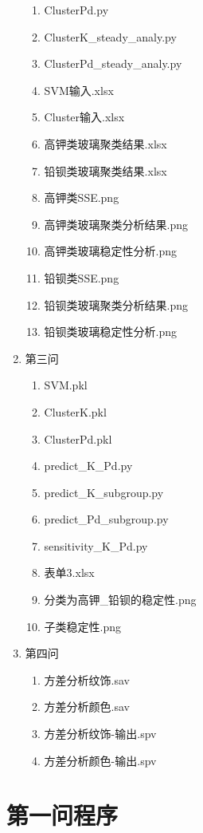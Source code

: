 \documentclass[withoutpreface,bwprint]{cumcmthesis}
\begin{document}
\begin{appendices}
\begin{enumerate}
\begin{enumerate}
				\item ClusterPd.py
				\item ClusterK\_steady\_analy.py
				\item ClusterPd\_steady\_analy.py
				\item SVM输入.xlsx
				\item Cluster输入.xlsx
				\item 高钾类玻璃聚类结果.xlsx
				\item 铅钡类玻璃聚类结果.xlsx
				\item 高钾类SSE.png
				\item 高钾类玻璃聚类分析结果.png
				\item 高钾类玻璃稳定性分析.png
				\item 铅钡类SSE.png
				\item 铅钡类玻璃聚类分析结果.png
				\item 铅钡类玻璃稳定性分析.png
			\end{enumerate}
			\item 第三问
			\begin{enumerate}
				\item SVM.pkl
				\item ClusterK.pkl
				\item ClusterPd.pkl
				\item predict\_K\_Pd.py
				\item predict\_K\_subgroup.py
				\item predict\_Pd\_subgroup.py
				\item sensitivity\_K\_Pd.py
				\item 表单3.xlsx
				\item 分类为高钾\_铅钡的稳定性.png
				\item 子类稳定性.png
			\end{enumerate}
			\item 第四问
			\begin{enumerate}
				\item 方差分析纹饰.sav
				\item 方差分析颜色.sav
				\item 方差分析纹饰-输出.spv
				\item 方差分析颜色-输出.spv
			\end{enumerate}
		\end{enumerate}
		\section{第一问程序}

\end{appendices}
\end{document}
